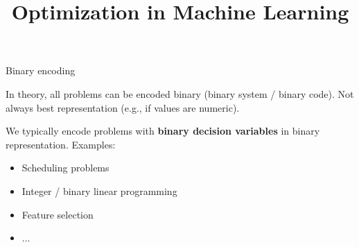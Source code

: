 \documentclass[11pt,compress,t,notes=noshow, xcolor=table]{beamer}
\title{Optimization in Machine Learning}
\date{}
\begin{document}
\sloppy

\begin{vbframe}{Binary encoding}

    In theory, all problems can be encoded binary (binary system / binary code). Not always best representation (e.g., if values are numeric). 
    
    \lz 

    We typically encode problems with \textbf{binary decision variables} in binary representation. Examples:
    \begin{itemize}
        \item Scheduling problems
        \item Integer / binary linear programming
        \item Feature selection 
        \item ... 
    \end{itemize}
    
\end{vbframe}
\end{document}
